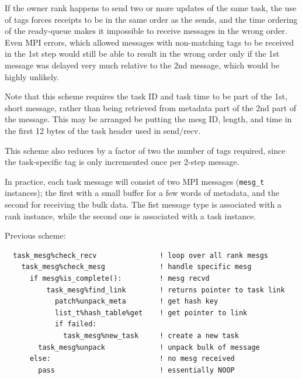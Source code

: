 \documentclass[paper=a4,fontsize=11pt]{scrartcl}
\numberwithin{equation}{section}		%
\numberwithin{figure}{section}			%
\numberwithin{table}{section}				%
\newcommand{\codecolor}{\color{Blue}}
\newcommand{\Code}[1]{{\codecolor\texttt{#1}}}
\begin{document}
If the owner rank happens to send two or more updates of the same task, the use of tags forces receipts to be in the same order as the sends, and the time ordering of the ready-queue makes it impossible to receive messages in the wrong order.  Even MPI errors, which allowed messages with non-matching tags to be received in the 1st step would still be able to result in the wrong order only if the 1st message was delayed very much relative to the 2nd message, which would be highly unlikely.

Note that this scheme requires the task ID and task time to be part of the 1st, short message, rather than being retrieved from metadata part of the 2nd part of the message.  This may be arranged be putting the mesg ID, length, and time in the first 12 bytes of the task header used in send/recv.

This scheme also reduces by a factor of two the number of tags required, since the task-specific tag is only incremented once per 2-step message.

In practice, each task message will consist of two MPI messages (\Code{mesg\_t} instances); the first with a small buffer for a few words of metadata, and the second for receiving the bulk data.  The fist message type is associated with a rank instance, while the second one is associated with a task instance.

Previous scheme:
{\codecolor\small\begin{verbatim}
  task_mesg%check_recv               ! loop over all rank mesgs
    task_mesg%check_mesg             ! handle specific mesg
      if mesg%is_complete():         ! mesg recvd
          task_mesg%find_link        ! returns pointer to task link
            patch%unpack_meta        ! get hash key
            list_t%hash_table%get    ! get pointer to link
            if failed:
              task_mesg%new_task     ! create a new task
        task_mesg%unpack             ! unpack bulk of message
      else:                          ! no mesg received
        pass                         ! essentially NOOP
\end{verbatim}}
\end{document}
